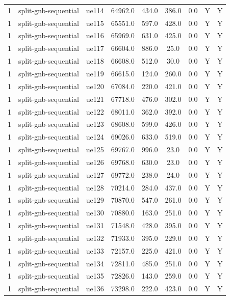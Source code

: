 \begin{table}[ht]
\begin{tabular}{|c|c|c|c|c|c|c|c|c|}
1 & split-gnb-sequential & ue114 & 64962.0 & 434.0 & 386.0 & 0.0 & Y & Y \\
1 & split-gnb-sequential & ue115 & 65551.0 & 597.0 & 428.0 & 0.0 & Y & Y \\
1 & split-gnb-sequential & ue116 & 65969.0 & 631.0 & 425.0 & 0.0 & Y & Y \\
1 & split-gnb-sequential & ue117 & 66604.0 & 886.0 & 25.0 & 0.0 & Y & Y \\
1 & split-gnb-sequential & ue118 & 66608.0 & 512.0 & 30.0 & 0.0 & Y & Y \\
1 & split-gnb-sequential & ue119 & 66615.0 & 124.0 & 260.0 & 0.0 & Y & Y \\
1 & split-gnb-sequential & ue120 & 67084.0 & 220.0 & 421.0 & 0.0 & Y & Y \\
1 & split-gnb-sequential & ue121 & 67718.0 & 476.0 & 302.0 & 0.0 & Y & Y \\
1 & split-gnb-sequential & ue122 & 68011.0 & 362.0 & 392.0 & 0.0 & Y & Y \\
1 & split-gnb-sequential & ue123 & 68608.0 & 599.0 & 426.0 & 0.0 & Y & Y \\
1 & split-gnb-sequential & ue124 & 69026.0 & 633.0 & 519.0 & 0.0 & Y & Y \\
1 & split-gnb-sequential & ue125 & 69767.0 & 996.0 & 23.0 & 0.0 & Y & Y \\
1 & split-gnb-sequential & ue126 & 69768.0 & 630.0 & 23.0 & 0.0 & Y & Y \\
1 & split-gnb-sequential & ue127 & 69772.0 & 238.0 & 24.0 & 0.0 & Y & Y \\
1 & split-gnb-sequential & ue128 & 70214.0 & 284.0 & 437.0 & 0.0 & Y & Y \\
1 & split-gnb-sequential & ue129 & 70870.0 & 547.0 & 261.0 & 0.0 & Y & Y \\
1 & split-gnb-sequential & ue130 & 70880.0 & 163.0 & 251.0 & 0.0 & Y & Y \\
1 & split-gnb-sequential & ue131 & 71548.0 & 428.0 & 395.0 & 0.0 & Y & Y \\
1 & split-gnb-sequential & ue132 & 71933.0 & 395.0 & 229.0 & 0.0 & Y & Y \\
1 & split-gnb-sequential & ue133 & 72157.0 & 225.0 & 421.0 & 0.0 & Y & Y \\
1 & split-gnb-sequential & ue134 & 72811.0 & 485.0 & 251.0 & 0.0 & Y & Y \\
1 & split-gnb-sequential & ue135 & 72826.0 & 143.0 & 259.0 & 0.0 & Y & Y \\
1 & split-gnb-sequential & ue136 & 73298.0 & 222.0 & 423.0 & 0.0 & Y & Y \\

\end{tabular}
\end{table}
